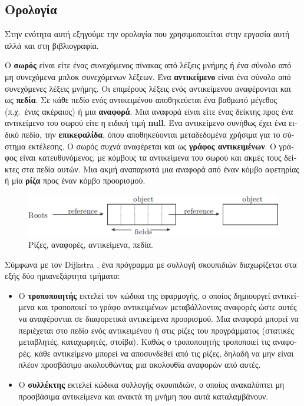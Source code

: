 \begin{greek}
\section{Ορολογία}
Στην ενότητα αυτή εξηγούμε την ορολογία που χρησιμοποιείται
στην εργασία αυτή αλλά και στη βιβλιογραφία.

Ο \textbf{σωρός} είναι είτε ένας συνεχόμενος πίνακας από λέξεις
μνήμης ή ένα σύνολο από μη συνεχόμενα μπλοκ συνεχόμενων λέξεων.
Ένα \textbf{αντικείμενο} είναι ένα σύνολο από συνεχόμενες λέξεις
μνήμης. Οι επιμέρους λέξεις ενός αντικείμενου αναφέρονται και ως
\textbf{πεδία}. Σε κάθε πεδίο ενός αντικειμένου αποθηκεύεται ένα
βαθμωτό μέγεθος (π.χ.\ ένας ακέραιος) ή μια \textbf{αναφορά}. Μια
αναφορά είναι είτε ένας δείκτης προς ένα αντικείμενο του σωρού
είτε η ειδική τιμή \textbf{null}. Ένα αντικείμενο συνήθως έχει
ένα ειδικό πεδίο, την \textbf{επικεφαλίδα}, όπου αποθηκεύονται
μεταδεδομένα χρήσιμα για το σύστημα εκτέλεσης. Ο σωρός συχνά
αναφέρεται και ως \textbf{γράφος αντικειμένων}. Ο γράφος είναι
κατευθυνόμενος, με κόμβους τα αντικείμενα του σωρού και ακμές
τους δείκτες στα πεδία αυτών. Μια ακμή αναπαριστά μια αναφορά από
έναν κόμβο αφετηρίας ή μία \textbf{ρίζα} προς έναν κόμβο προορισμού.

\begin{figure}
 \centering
 \includegraphics{figures/intro_3}
 \caption[Ρίζες, αναφορές, αντικείμενα, πεδία]
   {Ρίζες, αναφορές, αντικείμενα, πεδία.}
 \label{fig:intro_3}
\end{figure}
 
Σύμφωνα με τον Dijkstra \cite{DBLP:conf/ac/DijkstraLMSS75,
DBLP:journals/cacm/DijkstraLMSS78}, ένα πρόγραμμα με συλλογή
σκουπιδιών διαχωρίζεται στα εξής δύο ημιανεξάρτητα τμήματα:

\begin{itemize}
\item Ο \textbf{τροποποιητής} εκτελεί τον κώδικα της εφαρμογής,
      ο οποίος δημιουργεί αντικείμενα και τροποποιεί το γράφο
      αντικειμένων μεταβάλλοντας αναφορές ώστε αυτές να αναφέρονται
      σε διαφορετικά αντικείμενα προορισμού. Μια αναφορά μπορεί
      να περιέχεται στο πεδίο ενός αντικειμένου ή στις ρίζες
      του προγράμματος (στατικές μεταβλητές, καταχωρητές, στοίβα).
      Καθώς ο τροποποιητής τροποποιεί τις αναφορές, κάθε αντικείμενο
      μπορεί να αποσυνδεθεί από τις ρίζες, δηλαδή να μην είναι
      πλέον προσβάσιμο ακολουθώντας μια ακολουθία αναφορών από
      αυτές.
\item Ο \textbf{συλλέκτης} εκτελεί κώδικα συλλογής σκουπιδιών,
      ο οποίος ανακαλύπτει μη προσβάσιμα αντικείμενα και ανακτά
      τη μνήμη που αυτά καταλαμβάνουν.
\end{itemize}


\end{greek}
